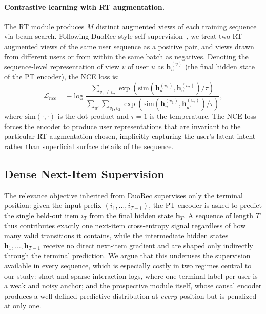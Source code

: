 \paragraph{Contrastive learning with RT augmentation.}
The RT module produces $M$ distinct augmented views of each training sequence via beam search. Following DuoRec-style self-supervision~\cite{wang2022duorec}, we treat two RT-augmented views of the same user sequence as a positive pair, and views drawn from different users or from within the same batch as negatives. Denoting the sequence-level representation of view $v$ of user $u$ as $\mathbf{h}_u^{(v)}$ (the final hidden state of the PT encoder), the NCE loss is:
\begin{equation}
\mathcal{L}_{nce} = -\log \frac{\sum_{v_1 \neq v_2} \exp(\text{sim}(\mathbf{h}_u^{(v_1)}, \mathbf{h}_u^{(v_2)}) / \tau)}
                              {\sum_{u'} \sum_{v_1, v_2} \exp(\text{sim}(\mathbf{h}_u^{(v_1)}, \mathbf{h}_{u'}^{(v_2)}) / \tau)},
\end{equation}
where $\text{sim}(\cdot,\cdot)$ is the dot product and $\tau=1$ is the temperature. The NCE loss forces the encoder to produce user representations that are invariant to the particular RT augmentation chosen, implicitly capturing the user's latent intent rather than superficial surface details of the sequence.

\subsection{Dense Next-Item Supervision}
\label{sec:dense}
The relevance objective inherited from DuoRec supervises only the terminal position: given the input prefix $(i_1, \dots, i_{T-1})$, the PT encoder is asked to predict the single held-out item $i_T$ from the final hidden state $\mathbf{h}_T$. A sequence of length $T$ thus contributes exactly one next-item cross-entropy signal regardless of how many valid transitions it contains, while the intermediate hidden states $\mathbf{h}_1, \dots, \mathbf{h}_{T-1}$ receive no direct next-item gradient and are shaped only indirectly through the terminal prediction. We argue that this underuses the supervision available in every sequence, which is especially costly in two regimes central to our study: short and sparse interaction logs, where one terminal label per user is a weak and noisy anchor; and the prospective module itself, whose causal encoder produces a well-defined predictive distribution at \emph{every} position but is penalized at only one.


